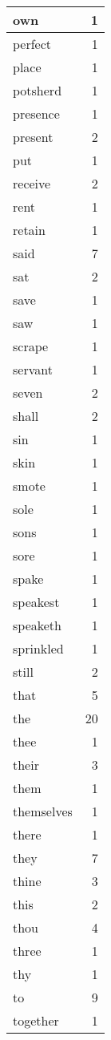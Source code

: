\begin{center}
\begin{longtable}{l|r}
own & 1\\ \hline 
perfect & 1\\ \hline 
place & 1\\ \hline 
potsherd & 1\\ \hline 
presence & 1\\ \hline 
present & 2\\ \hline 
put & 1\\ \hline 
receive & 2\\ \hline 
rent & 1\\ \hline 
retain & 1\\ \hline 
said & 7\\ \hline 
sat & 2\\ \hline 
save & 1\\ \hline 
saw & 1\\ \hline 
scrape & 1\\ \hline 
servant & 1\\ \hline 
seven & 2\\ \hline 
shall & 2\\ \hline 
sin & 1\\ \hline 
skin & 1\\ \hline 
smote & 1\\ \hline 
sole & 1\\ \hline 
sons & 1\\ \hline 
sore & 1\\ \hline 
spake & 1\\ \hline 
speakest & 1\\ \hline 
speaketh & 1\\ \hline 
sprinkled & 1\\ \hline 
still & 2\\ \hline 
that & 5\\ \hline 
the & 20\\ \hline 
thee & 1\\ \hline 
their & 3\\ \hline 
them & 1\\ \hline 
themselves & 1\\ \hline 
there & 1\\ \hline 
they & 7\\ \hline 
thine & 3\\ \hline 
this & 2\\ \hline 
thou & 4\\ \hline 
three & 1\\ \hline 
thy & 1\\ \hline 
to & 9\\ \hline 
together & 1\\ \hline 

\end{longtable}
\end{center}

